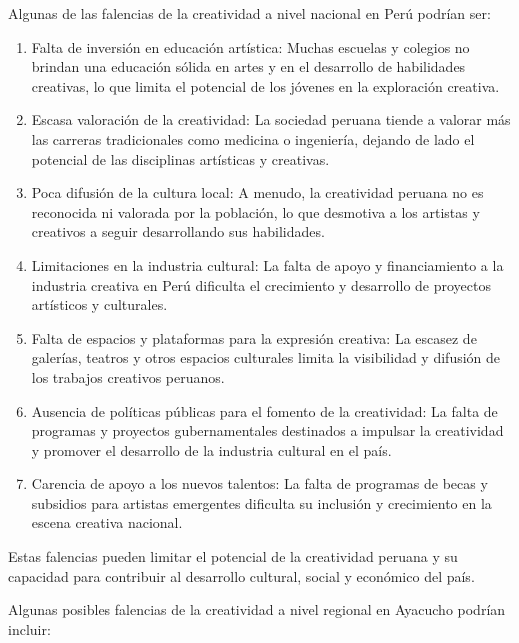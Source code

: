\documentclass[12pt,a4paper]{article}
\begin{document}
Algunas de las falencias de la creatividad a nivel nacional en Perú podrían ser:
\begin{enumerate}
\item Falta de inversión en educación artística: Muchas escuelas y colegios no brindan una educación sólida en artes y en el desarrollo de habilidades creativas, lo que limita el potencial de los jóvenes en la exploración creativa.
\item Escasa valoración de la creatividad: La sociedad peruana tiende a valorar más las carreras tradicionales como medicina o ingeniería, dejando de lado el potencial de las disciplinas artísticas y creativas.
\item Poca difusión de la cultura local: A menudo, la creatividad peruana no es reconocida ni valorada por la población, lo que desmotiva a los artistas y creativos a seguir desarrollando sus habilidades.
\item Limitaciones en la industria cultural: La falta de apoyo y financiamiento a la industria creativa en Perú dificulta el crecimiento y desarrollo de proyectos artísticos y culturales.
\item Falta de espacios y plataformas para la expresión creativa: La escasez de galerías, teatros y otros espacios culturales limita la visibilidad y difusión de los trabajos creativos peruanos.
\item Ausencia de políticas públicas para el fomento de la creatividad: La falta de programas y proyectos gubernamentales destinados a impulsar la creatividad y promover el desarrollo de la industria cultural en el país.
\item Carencia de apoyo a los nuevos talentos: La falta de programas de becas y subsidios para artistas emergentes dificulta su inclusión y crecimiento en la escena creativa nacional.
\end{enumerate}


Estas falencias pueden limitar el potencial de la creatividad peruana y su capacidad para contribuir al desarrollo cultural, social y económico del país.

Algunas posibles falencias de la creatividad a nivel regional en Ayacucho podrían incluir:
\end{document}
